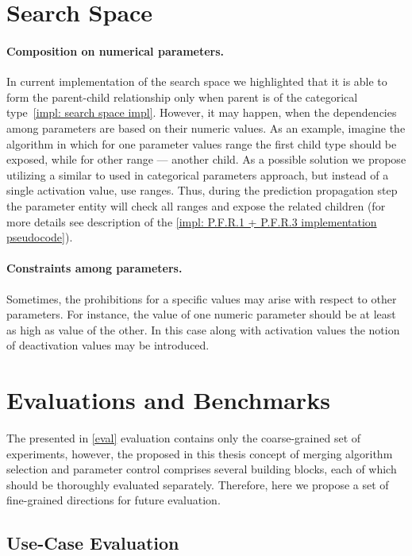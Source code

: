 \section{Search Space}\label{fw: search space}
\paragraph{Composition on numerical parameters.} In current implementation of the search space we highlighted that it is able to form the parent-child relationship only when parent is of the categorical type~\cref{impl: search space impl}. However, it may happen, when the dependencies among parameters are based on their numeric values. As an example, imagine the algorithm in which for one parameter values range the first child type should be exposed, while for other range — another child. As a possible solution we propose utilizing a similar to used in categorical parameters approach, but instead of a single activation value, use ranges. Thus, during the prediction propagation step the parameter entity will check all ranges and expose the related children (for more details see description of the \cref{impl: P.F.R.1 + P.F.R.3 implementation pseudocode}).

\paragraph{Constraints among parameters.} Sometimes, the prohibitions for a specific values may arise with respect to other parameters. For instance, the value of one numeric parameter should be at least as high as value of the other. In this case along with activation values the notion of deactivation values may be introduced.

\section{Evaluations and Benchmarks}\label{fw: evaluation}
The presented in \cref{eval} evaluation contains only the coarse-grained set of experiments, however, the proposed in this thesis concept of merging algorithm selection and parameter control comprises several building blocks, each of which should be thoroughly evaluated separately. Therefore, here we propose a set of fine-grained directions for future evaluation.
 
\subsection{Use-Case Evaluation}
